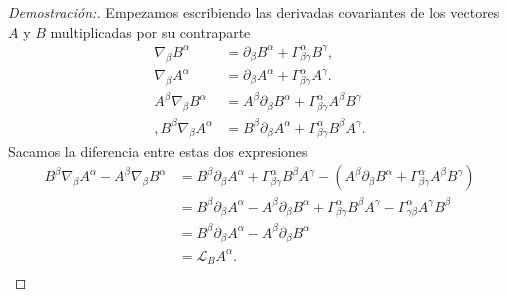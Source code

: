 \begin{proof}[Demostración:]
    Empezamos escribiendo las derivadas covariantes de los vectores $A$ y $B$ multiplicadas por su contraparte
    \begin{align*}
        \nabla_\beta B^\alpha & =\partial_\beta B^\alpha+\Gamma_{\beta \gamma}^\alpha B^\gamma ,\\
        \nabla_\beta A^\alpha & =\partial_\beta A^\alpha+\Gamma_{\beta \gamma}^\alpha A^\gamma .\\
        A^\beta \nabla_\beta B^\alpha & =A^\beta \partial_\beta B^\alpha+\Gamma_{\beta \gamma}^\alpha A^\beta B^\gamma  \\,
        B^\beta \nabla_\beta A^\alpha & =B^\beta \partial_\beta A^\alpha+\Gamma_{\beta \gamma}^\alpha B^\beta A^\gamma.
    \end{align*}
    Sacamos la diferencia entre estas dos expresiones
    \begin{equation}
        \begin{aligned}
            B^\beta \nabla_\beta A^\alpha  - A^\beta \nabla_\beta B^\alpha & = B^\beta \partial_\beta A^\alpha+\Gamma_{\beta \gamma}^\alpha B^\beta A^\gamma- (A^\beta \partial_\beta B^\alpha+\Gamma_{\beta \gamma}^\alpha A^\beta B^\gamma )   \\
                                                                           & = B^\beta \partial_\beta A^\alpha - A^\beta \partial_\beta B^\alpha+\Gamma_{\beta \gamma}^\alpha  B^\beta A^\gamma -\Gamma_{ \gamma \beta}^\alpha A^\gamma  B^\beta \\
                                                                           & =B^\beta \partial_\beta A^\alpha - A^\beta \partial_\beta B^\alpha                                                                                                  \\
                                                                           & = \mathscr{L}_B A^\alpha .                                                                                                                                          \\
        \end{aligned}
    \end{equation}
\end{proof}

